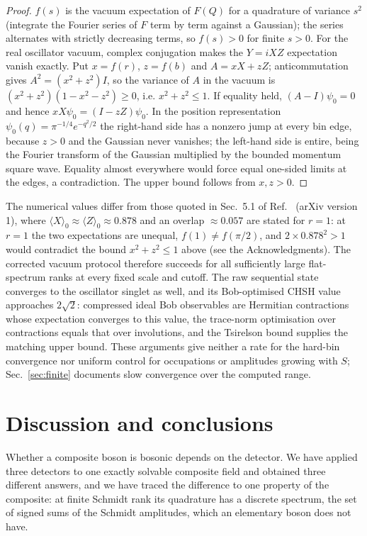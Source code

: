 \documentclass[11pt,a4paper]{article}
\begin{document}
\begin{proof}
$f(s)$ is the vacuum expectation of $F(Q)$ for a quadrature of variance $s^2$ (integrate the Fourier series of $F$ term by term against a Gaussian); the series alternates with strictly decreasing terms, so $f(s)>0$ for finite $s>0$. For the real oscillator vacuum, complex conjugation makes the $Y=iXZ$ expectation vanish exactly. Put $x=f(r)$, $z=f(b)$ and $A=xX+zZ$; anticommutation gives $A^2=(x^2+z^2)I$, so the variance of $A$ in the vacuum is $(x^2+z^2)(1-x^2-z^2)\ge0$, i.e. $x^2+z^2\le1$. If equality held, $(A-I)\psi_0=0$ and hence $xX\psi_0=(I-zZ)\psi_0$. In the position representation $\psi_0(q)=\pi^{-1/4}e^{-q^2/2}$ the right-hand side has a nonzero jump at every bin edge, because $z>0$ and the Gaussian never vanishes; the left-hand side is entire, being the Fourier transform of the Gaussian multiplied by the bounded momentum square wave. Equality almost everywhere would force equal one-sided limits at the edges, a contradiction. The upper bound follows from $x,z>0$.
\end{proof}

The numerical values differ from those quoted in Sec.~5.1 of Ref.~\cite{Sorella2026} (arXiv version 1), where $\langle X\rangle_0\approx\langle Z\rangle_0\approx0.878$ and an overlap $\approx0.057$ are stated for $r=1$: at $r=1$ the two expectations are unequal, $f(1)\ne f(\pi/2)$, and $2\times0.878^2>1$ would contradict the bound $x^2+z^2\le1$ above (see the Acknowledgments). The corrected vacuum protocol therefore succeeds for all sufficiently large flat-spectrum ranks at every fixed scale and cutoff. The raw sequential state converges to the oscillator singlet as well, and its Bob-optimised CHSH value approaches $2\sqrt2$: compressed ideal Bob observables are Hermitian contractions whose expectation converges to this value, the trace-norm optimisation over contractions equals that over involutions, and the Tsirelson bound \cite{Cirelson1980} supplies the matching upper bound. These arguments give neither a rate for the hard-bin convergence nor uniform control for occupations or amplitudes growing with $S$; Sec.~\ref{sec:finite} documents slow convergence over the computed range.

\section{Discussion and conclusions}
\label{sec:conclusion}
Whether a composite boson is bosonic depends on the detector. We have applied three detectors to one exactly solvable composite field and obtained three different answers, and we have traced the difference to one property of the composite: at finite Schmidt rank its quadrature has a discrete spectrum, the set of signed sums of the Schmidt amplitudes, which an elementary boson does not have.
\end{document}
